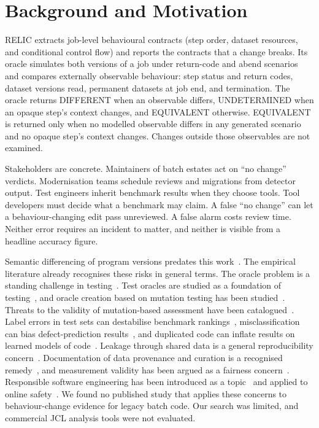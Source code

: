 \documentclass[conference]{IEEEtran}
\begin{document}
\section{Background and Motivation}
RELIC extracts job-level behavioural contracts (step order, dataset resources, and conditional control flow) and reports the contracts that a change breaks. Its oracle simulates both versions of a job under return-code and abend scenarios and compares externally observable behaviour: step status and return codes, dataset versions read, permanent datasets at job end, and termination. The oracle returns DIFFERENT when an observable differs, UNDETERMINED when an opaque step's context changes, and EQUIVALENT otherwise. EQUIVALENT is returned only when no modelled observable differs in any generated scenario and no opaque step's context changes. Changes outside those observables are not examined.

Stakeholders are concrete. Maintainers of batch estates act on ``no change'' verdicts. Modernisation teams schedule reviews and migrations from detector output. Test engineers inherit benchmark results when they choose tools. Tool developers must decide what a benchmark may claim. A false ``no change'' can let a behaviour-changing edit pass unreviewed. A false alarm costs review time. Neither error requires an incident to matter, and neither is visible from a headline accuracy figure.

Semantic differencing of program versions predates this work~\cite{jackson1994}. The empirical literature already recognises these risks in general terms. The oracle problem is a standing challenge in testing~\cite{barr2015}. Test oracles are studied as a foundation of testing~\cite{staats2011}, and oracle creation based on mutation testing has been studied~\cite{staats2012}. Threats to the validity of mutation-based assessment have been catalogued~\cite{papadakis2016}. Label errors in test sets can destabilise benchmark rankings~\cite{northcutt2021}, misclassification can bias defect-prediction results~\cite{herzig2013}, and duplicated code can inflate results on learned models of code~\cite{allamanis2019}. Leakage through shared data is a general reproducibility concern~\cite{kapoor2023}. Documentation of data provenance and curation is a recognised remedy~\cite{gebru2021}, and measurement validity has been argued as a fairness concern~\cite{jacobs2021}. Responsible software engineering has been introduced as a topic~\cite{schieferdecker2019} and applied to online safety~\cite{zhang2025}. We found no published study that applies these concerns to behaviour-change evidence for legacy batch code. Our search was limited, and commercial JCL analysis tools were not evaluated.
\end{document}
